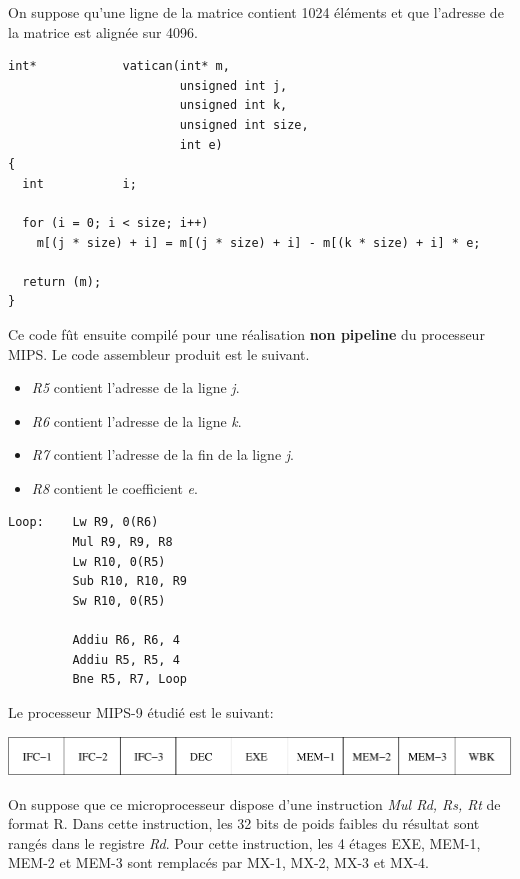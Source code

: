 On suppose qu'une ligne de la matrice contient 1024 \'el\'ements
et que l'adresse de la matrice est align\'ee sur 4096.

\begin{verbatim}
int*            vatican(int* m,
                        unsigned int j,
                        unsigned int k,
                        unsigned int size,
                        int e)
{
  int           i;

  for (i = 0; i < size; i++)
    m[(j * size) + i] = m[(j * size) + i] - m[(k * size) + i] * e;

  return (m);
}
\end{verbatim}

Ce code f\^ut ensuite compil\'e pour une r\'ealisation \textbf{non pipeline}
du processeur MIPS. Le code assembleur produit est le suivant.

\begin{itemize}
  \item
    \textit{R5} contient l'adresse de la ligne \textit{j}.
  \item
    \textit{R6} contient l'adresse de la ligne \textit{k}.
  \item
    \textit{R7} contient l'adresse de la fin de la ligne \textit{j}.
  \item
    \textit{R8} contient le coefficient \textit{e}.
\end{itemize}

\begin{verbatim}
Loop:    Lw R9, 0(R6)
         Mul R9, R9, R8
         Lw R10, 0(R5)
         Sub R10, R10, R9
         Sw R10, 0(R5)

         Addiu R6, R6, 4
         Addiu R5, R5, 4
         Bne R5, R7, Loop
\end{verbatim}

Le processeur MIPS-9 \'etudi\'e est le suivant:

\begin{center}
  \includegraphics[scale=0.6]{figures/pipeline.pdf}
\end{center}

On suppose que ce microprocesseur dispose d'une instruction
\textit{Mul Rd, Rs, Rt} de format R. Dans cette instruction, les 32 bits
de poids faibles du r\'esultat sont rang\'es dans le registre \textit{Rd}.
Pour cette instruction, les 4 \'etages EXE, MEM-1, MEM-2 et MEM-3 sont
remplac\'es par MX-1, MX-2, MX-3 et MX-4.

